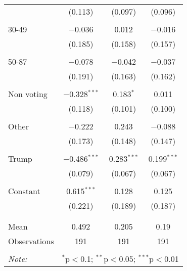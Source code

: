 \begin{tabular}{@{\extracolsep{5pt}}lccc}
  & (0.113) & (0.097) & (0.096) \\ 
  & & & \\ 
 30-49 & $-$0.036 & 0.012 & $-$0.016 \\ 
  & (0.185) & (0.158) & (0.157) \\ 
  & & & \\ 
 50-87 & $-$0.078 & $-$0.042 & $-$0.037 \\ 
  & (0.191) & (0.163) & (0.162) \\ 
  & & & \\ 
 Non voting & $-$0.328$^{***}$ & 0.183$^{*}$ & 0.011 \\ 
  & (0.118) & (0.101) & (0.100) \\ 
  & & & \\ 
 Other & $-$0.222 & 0.243 & $-$0.088 \\ 
  & (0.173) & (0.148) & (0.147) \\ 
  & & & \\ 
 Trump & $-$0.486$^{***}$ & 0.283$^{***}$ & 0.199$^{***}$ \\ 
  & (0.079) & (0.067) & (0.067) \\ 
  & & & \\ 
 Constant & 0.615$^{***}$ & 0.128 & 0.125 \\ 
  & (0.221) & (0.189) & (0.187) \\ 
  & & & \\ 
\hline \\[-1.8ex] 
Mean & 0.492 & 0.205 & 0.19 \\ 
Observations & 191 & 191 & 191 \\ 
\hline 
\hline \\[-1.8ex] 
\textit{Note:}  & \multicolumn{3}{r}{$^{*}$p$<$0.1; $^{**}$p$<$0.05; $^{***}$p$<$0.01} \\ 
\end{tabular} 
